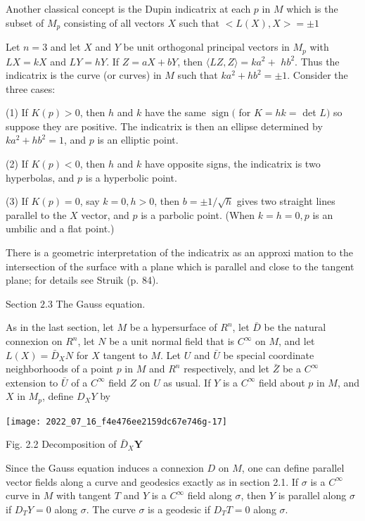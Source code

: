 \documentclass[10pt]{article}
\begin{document}
Another classical concept is the Dupin indicatrix at each $p$ in $M$ which is the subset of $M_{p}$ consisting of all vectors $X$ such that $<L(X), X>=\pm 1$

Let $n=3$ and let $X$ and $Y$ be unit orthogonal principal vectors in $M_{p}$ with $L X=k X$ and $L Y=h Y$. If $Z=a X+b Y$, then $\langle L Z, Z\rangle=k a^{2}+$ $h b^{2}$. Thus the indicatrix is the curve (or curves) in $M$ such that $k a^{2}+h b^{2}=\pm 1$. Consider the three cases:

(1) If $K(p)>0$, then $h$ and $k$ have the same $\operatorname{sign}($ for $K=h k=$ det $L)$ so suppose they are positive. The indicatrix is then an ellipse determined by $k a^{2}+h b^{2}=1$, and $p$ is an elliptic point.

(2) If $K(p)<0$, then $h$ and $k$ have opposite signs, the indicatrix is two hyperbolas, and $p$ is a hyperbolic point.

(3) If $K(p)=0$, say $k=0, h>0$, then $b=\pm 1 / \sqrt{h}$ gives two straight lines parallel to the $X$ vector, and $p$ is a parbolic point. (When $k=h=0, p$ is an umbilic and a flat point.)

There is a geometric interpretation of the indicatrix as an approxi mation to the intersection of the surface with a plane which is parallel and close to the tangent plane; for details see Struik (p. 84).

Section $2.3$ The Gauss equation.

As in the last section, let $M$ be a hypersurface of $R^{n}$, let $\bar{D}$ be the natural connexion on $R^{n}$, let $N$ be a unit normal field that is $C^{\infty}$ on $M$, and let $L(X)=\bar{D}_{X} N$ for $X$ tangent to $M .$ Let $U$ and $\bar{U}$ be special coordinate neighborhoods of a point $p$ in $M$ and $R^{n}$ respectively, and let $\bar{Z}$ be a $C^{\infty}$ extension to $\bar{U}$ of a $C^{\infty}$ field $Z$ on $U$ as usual. If $Y$ is a $C^{\infty}$ field about $p$ in $M$, and $X$ in $M_{p}$, define $D_{X} Y$ by

\texttt{[image: 2022\_07\_16\_f4e476ee2159dc67e746g-17]}

Fig. 2.2 Decomposition of $\bar{D}_{X} \boldsymbol{Y}$

Since the Gauss equation induces a connexion $D$ on $M$, one can define parallel vector fields along a curve and geodesics exactly as in section 2.1. If $\sigma$ is a $C^{\infty}$ curve in $M$ with tangent $T$ and $Y$ is a $C^{\infty}$ field along $\sigma$, then $Y$ is parallel along $\sigma$ if $D_{T} Y=0$ along $\sigma$. The curve $\sigma$ is a geodesic if $D_{T} T=0$ along $\sigma$.
\end{document}
